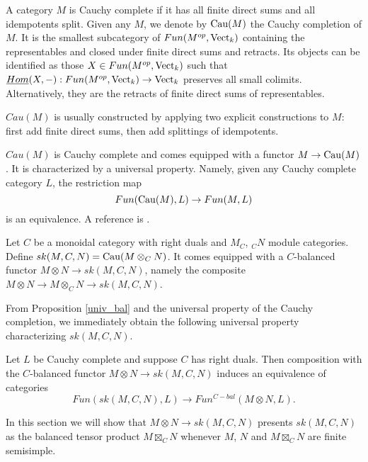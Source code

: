 \begin{definition}

A category $M$ is Cauchy complete if it has all finite direct sums and all idempotents split. Given any $M$, we denote by $\operatorname{Cau}(M)$ the Cauchy completion of $M$. It is the smallest subcategory of $Fun(M^{op},\operatorname{Vect}_k)$ containing the representables and closed under finite direct sums and retracts. Its objects can be identified as those $X\in Fun(M^{op},\operatorname{Vect}_k)$ such that $\underline{Hom}(X,-):Fun(M^{op},\operatorname{Vect}_k)\to\operatorname{Vect}_k$ preserves all small colimits.  Alternatively, they are the retracts of finite direct sums of representables.

$Cau(M)$ is usually constructed by applying two explicit constructions to $M$: first add finite direct sums, then add splittings of idempotents.

$Cau(M)$ is Cauchy complete and comes equipped with a functor $M\to \operatorname{Cau}(M)$. It is characterized by a universal property. Namely, given any Cauchy complete category $L$, the restriction map $$Fun(\operatorname{Cau}(M),L)\to Fun(M,L)$$ is an equivalence. A reference is \cite[Sections 5.5 and 5.7]{kelly/basic-concepts-enriched}.\end{definition}

\begin{definition}

Let $C$ be a monoidal category with right duals and $M_C$, $_{C}N$ module categories. Define $sk(M,C,N)=\operatorname{Cau}(M\otimes_C N)$. It comes equipped with a $C$-balanced functor $M\otimes N \to sk(M,C,N)$, namely the composite $M\otimes N\to M\otimes_C N\to sk(M,C,N)$.\end{definition}

From Proposition \ref{univ_bal} and the universal property of the Cauchy completion, we immediately obtain the following universal property characterizing $sk(M,C,N)$.

\begin{proposition}\label{univ_sk}
Let $L$ be Cauchy complete and suppose $C$ has right duals. Then composition with the $C$-balanced functor $M\otimes N\to sk(M,C,N)$ induces an equivalence of categories $$Fun(sk(M,C,N),L)\to Fun^{C-bal}(M\otimes N,L).$$ \end{proposition}


In this section we will show that $M\otimes N\to sk(M,C,N)$ presents $sk(M,C,N)$ as the balanced tensor product $M\boxtimes_C N$ whenever $M$, $N$ and $M\boxtimes_C N$ are finite semisimple.

